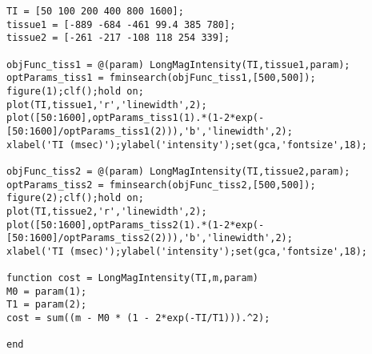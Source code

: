 \documentclass[12pt]{article}
\begin{document}
\begin{lstlisting}[style=Matlab-editor]
%Q5
TI = [50 100 200 400 800 1600];
tissue1 = [-889 -684 -461 99.4 385 780];
tissue2 = [-261 -217 -108 118 254 339];

objFunc_tiss1 = @(param) LongMagIntensity(TI,tissue1,param);
optParams_tiss1 = fminsearch(objFunc_tiss1,[500,500]);
figure(1);clf();hold on;
plot(TI,tissue1,'r','linewidth',2);
plot([50:1600],optParams_tiss1(1).*(1-2*exp(-[50:1600]/optParams_tiss1(2))),'b','linewidth',2);
xlabel('TI (msec)');ylabel('intensity');set(gca,'fontsize',18);

objFunc_tiss2 = @(param) LongMagIntensity(TI,tissue2,param);
optParams_tiss2 = fminsearch(objFunc_tiss2,[500,500]);
figure(2);clf();hold on;
plot(TI,tissue2,'r','linewidth',2);
plot([50:1600],optParams_tiss2(1).*(1-2*exp(-[50:1600]/optParams_tiss2(2))),'b','linewidth',2);
xlabel('TI (msec)');ylabel('intensity');set(gca,'fontsize',18);

function cost = LongMagIntensity(TI,m,param)
M0 = param(1);
T1 = param(2);
cost = sum((m - M0 * (1 - 2*exp(-TI/T1))).^2);

end
\end{lstlisting}
\end{document}
